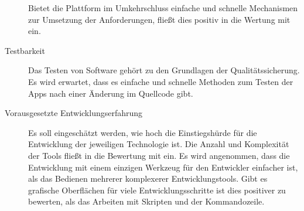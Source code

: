\begin{description}
		Bietet die Plattform im Umkehrschluss einfache und schnelle Mechanismen zur Umsetzung der Anforderungen, fließt dies positiv in die Wertung mit ein.
		
	\item[Testbarkeit]
		Das Testen von Software gehört zu den Grundlagen der Qualitätssicherung. Es wird erwartet, dass es einfache und schnelle Methoden zum Testen der Apps nach einer Änderung im Quellcode gibt.
	
	\item[Vorausgesetzte Entwicklungserfahrung]
		Es soll eingeschätzt werden, wie hoch die Einstiegshürde für die Entwicklung der jeweiligen Technologie ist. Die Anzahl und Komplexität der Tools fließt in die Bewertung mit ein. Es wird angenommen, dass die Entwicklung mit einem einzigen Werkzeug für den Entwickler einfacher ist, als das Bedienen mehrerer komplexerer Entwicklungstools. Gibt es grafische Oberflächen für viele Entwicklungsschritte ist dies positiver zu bewerten, als das Arbeiten mit Skripten und der Kommandozeile.
		
\end{description}


